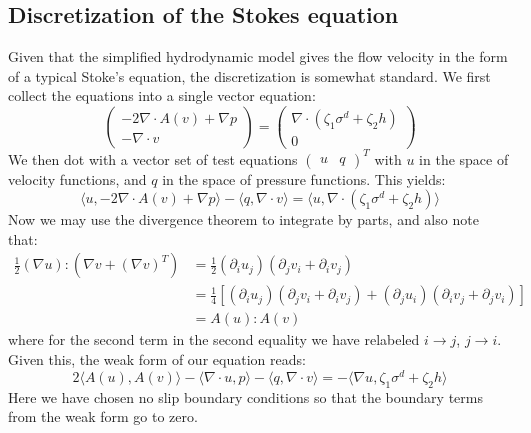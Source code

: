 \documentclass[reqno]{article}
\begin{document}
  \subsection{Discretization of the Stokes equation}
  Given that the simplified hydrodynamic model gives the flow velocity in the
  form of a typical Stoke's equation, the discretization is somewhat standard.
  We first collect the equations into a single vector equation:
  \begin{equation}
    \begin{pmatrix}
      -2 \nabla \cdot A(v) + \nabla p \\
      - \nabla \cdot v
    \end{pmatrix}
    =
    \begin{pmatrix}
      \nabla \cdot \left( \zeta_1 \sigma^d + \zeta_2 h \right) \\
      0
    \end{pmatrix}
  \end{equation}
  We then dot with a vector set of test equations $\begin{pmatrix} u &q \end{pmatrix}^T$ with
  $u$ in the space of velocity functions, and $q$ in the space of pressure
  functions.
  This yields:
  \begin{equation}
    \langle u, -2 \nabla \cdot A(v) + \nabla p \rangle - \langle q, \nabla \cdot v \rangle
    =
    \langle u, \nabla \cdot \left( \zeta_1 \sigma^d + \zeta_2 h \right) \rangle
  \end{equation}
  Now we may use the divergence theorem to integrate by parts, and also note
  that:
  \begin{equation}
    \begin{split}
      \tfrac12 \left( \nabla u \right) : \left( \nabla v + \left( \nabla v \right)^T \right)
      &= \tfrac12
      \left(\partial_i u_{j} \right) \left( \partial_j v_i + \partial_i v_j \right) \\
      &= \tfrac14 \left[  \left(\partial_i u_{j} \right) \left( \partial_j v_i + \partial_i v_j \right)
        + \left(\partial_j u_{i} \right) \left( \partial_i v_j + \partial_j v_i \right)
      \right] \\
      &= A(u) : A(v)
    \end{split}
  \end{equation}
  where for the second term in the second equality we have relabeled $i \to j$,
  $j \to i$.
  Given this, the weak form of our equation reads:
  \begin{equation}
    2\langle A(u), A(v)  \rangle
    - \langle \nabla \cdot u, p \rangle
    - \langle q, \nabla \cdot v \rangle
    =
    -\langle \nabla u, \zeta_1 \sigma^d + \zeta_2 h \rangle
  \end{equation}
  Here we have chosen no slip boundary conditions so that the boundary terms
  from the weak form go to zero.
\end{document}
